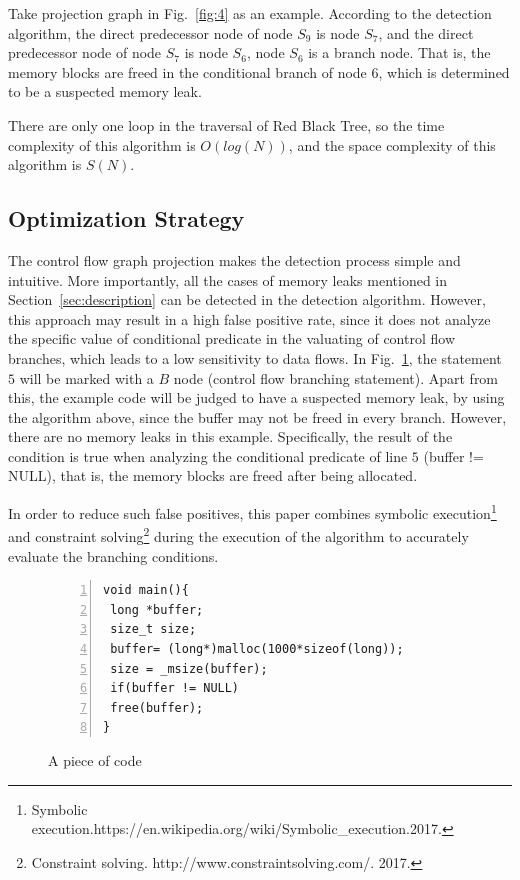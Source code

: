Take projection graph in Fig.~\ref{fig:4} as an example. According to the detection algorithm, the direct predecessor node of node $S_9$ is node $S_7$, and the direct predecessor node of node $S_7$ is node $S_6$, node $S_6$ is a branch node. That is, the memory blocks are freed in the conditional branch of node $6$, which is determined to be a suspected memory leak.

There are only one loop in the traversal of Red Black Tree, so the time complexity of this algorithm is $O(log(N))$, and the space complexity of this algorithm is $S(N)$.

\subsection{Optimization Strategy}

The control flow graph projection makes the detection process simple and intuitive. More importantly, all the cases of memory leaks mentioned in Section~\ref{sec:description} can be detected in the detection algorithm. However, this approach may result in a high false positive rate, since it does not analyze the specific value of conditional predicate in the valuating of control flow branches, which leads to a low sensitivity to data flows. In Fig.~\ref{fig:7}, the statement $5$ will be marked with a $B$ node (control flow branching statement). Apart from this, the example code will be judged to have a suspected memory leak, by using the algorithm above, since the buffer may not be freed in every branch. However, there are no memory leaks in this example. Specifically, the result of the condition is true when analyzing the conditional predicate of line $5$ (buffer != NULL), that is, the memory blocks are freed after being allocated. 

In order to reduce such false positives, this paper combines symbolic execution\footnote{Symbolic execution.https://en.wikipedia.org/wiki/Symbolic\_execution.2017.} and constraint solving\footnote{Constraint solving. http://www.constraintsolving.com/. 2017.} during the execution of the algorithm to accurately evaluate the branching conditions.
%
\begin{figure}[!h]
\small
\center
\begin{lstlisting}[frame=single,framexrightmargin=-10pt,numbers=left] 
void main(){
 long *buffer;
 size_t size;
 buffer= (long*)malloc(1000*sizeof(long));
 size = _msize(buffer);
 if(buffer != NULL)
 free(buffer);
}
\end{lstlisting}
\caption{A piece of code}\label{fig:7}
\end{figure}


